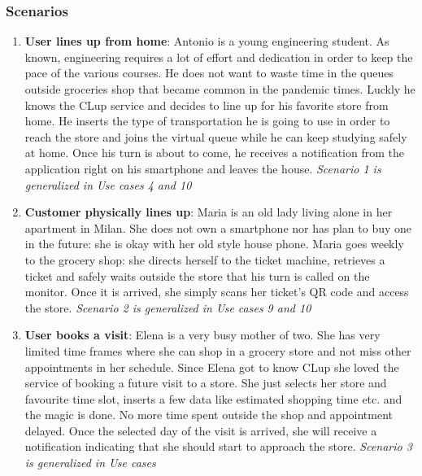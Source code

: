 \documentclass[]{article}
\begin{document}
	\subsubsection{Scenarios}

\begin{enumerate}
	
	\item \textbf{User lines up from home}: \newline
	Antonio is a young engineering student. As known, engineering requires a lot of effort and dedication in order to keep the pace of the various courses. He does not want to waste time in the queues outside groceries shop that became common in the pandemic times. Luckly he knows the CLup service and decides to line up for his favorite store from home. \newline He inserts the type of transportation he is going to use in order to reach the store and joins the virtual queue while he can keep studying safely at home. Once his turn is about to come, he receives a notification from the application right on his smartphone and leaves the house. \newline
	\textit{Scenario 1 is generalized in Use cases 4 and 10} \newline
	
	\item \textbf{Customer physically lines up}: \newline
	Maria is an old lady living alone in her apartment in Milan. She does not own a smartphone nor has plan to buy one in the future: she is okay with her old style house phone. \newline Maria goes weekly to the grocery shop: she directs herself to the ticket machine, retrieves a ticket and safely waits outside the store that his turn is called on the monitor. Once it is arrived, she simply scans her ticket's QR code and access the store. \newline
	\textit{Scenario 2 is generalized in Use cases 9 and 10} \newline
	
	
	\item \textbf{User books a visit}: \newline
	Elena is a very busy mother of two. She has very limited time frames where she can shop in a grocery store and not miss other appointments in her schedule. \newline
	Since Elena got to know CLup she loved the service of booking a future visit to a store. She just selects her store and favourite time slot, inserts a few data like estimated shopping time etc. and the magic is done. No more time spent outside the shop and appointment delayed.\newline
	Once the selected day of the visit is arrived, she will receive a notification indicating that she should start to approach the store. \newline
	\textit{Scenario 3 is generalized in Use cases } \newline
	

\end{enumerate}
\end{document}
